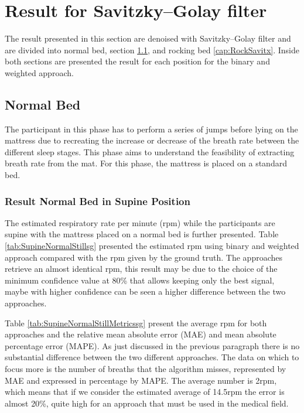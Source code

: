 \clearpage
\section{Result for Savitzky–Golay filter} \label{cap:ResultMODWTRA}

The result presented in this section are denoised with Savitzky–Golay filter and are
 divided into normal bed, section \ref{cap:normalSavitz}, and rocking bed \ref{cap:RockSavitx}. Inside both sections are presented the result for each position for the binary and weighted approach.


\subsection{Normal Bed} \label{cap:normalSavitz}

The participant in this phase has to perform a series of jumps before lying on the mattress due to recreating the increase or decrease of the breath rate between the different sleep stages. This phase aims to understand the feasibility of extracting breath rate from the mat. For this phase, the mattress is placed on a standard bed.


\subsubsection{Result Normal Bed in Supine Position}  
The estimated respiratory rate per minute (rpm) while the participants are supine with the mattress placed on a normal bed is further presented. Table \ref{tab:SupineNormalStillsg} presented the estimated rpm using binary and weighted approach compared with the rpm given by the ground truth. The approaches retrieve an almost identical rpm, this result may be due to the choice of the minimum confidence value at 80\% that allows keeping only the best signal, maybe with higher confidence can be seen a higher difference between the two approaches. 

\vspace{0.5cm}


Table \ref{tab:SupineNormalStillMetricssg} present the average rpm for both approaches  
and the relative mean absolute error (MAE) and mean absolute percentage error (MAPE). As just discussed in the previous paragraph there is no substantial difference between the two different approaches. The data on which to focus more is the number of breaths that the algorithm misses, represented by MAE and expressed in percentage by MAPE. The average number is 2rpm, which means that if we consider the estimated average of 14.5rpm the error is almost 20\%, quite high for an approach that must be used in the medical field.

